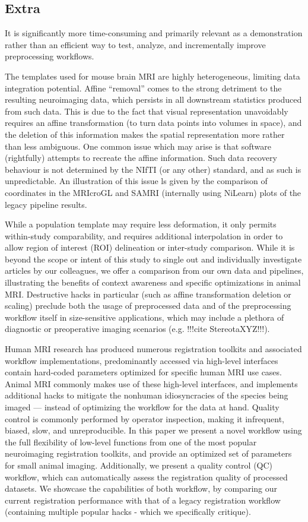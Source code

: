 \subsection{Extra}
It is significantly more time-consuming and primarily relevant as a demonstration rather than an efficient way to test, analyze, and incrementally improve preprocessing workflows.



The templates used for mouse brain MRI are highly heterogeneous, limiting data integration potential.
Affine “removal” comes to the strong detriment to the resulting neuroimaging data, which persists in all downstream statistics produced from such data.
This is due to the fact that visual representation unavoidably requires an affine transformation (to turn data points into volumes in space), and the deletion of this information makes the spatial representation more rather than less ambiguous.
One common issue which may arise is that software (rightfully) attempts to recreate the affine information.
Such data recovery behaviour is not determined by the NIfTI (or any other) standard, and as such is unpredictable.
An illustration of this issue ls given by the comparison of coordinates in the MRIcroGL and SAMRI (internally using NiLearn) plots of the legacy pipeline results.

While a population template may require less deformation, it only permits within-study comparability, and requires additional interpolation in order to allow region of interest (ROI) delineation or inter-study comparison.
While it is beyond the scope or intent of this study to single out and individually investigate articles by our colleagues, we offer a comparison from our own data and pipelines, illustrating the benefits of context awareness and specific optimizations in animal MRI.
Destructive hacks in particular (such as affine transformation deletion or scaling) preclude both the usage of preprocessed data and of the preprocessing workflow itself in size-sensitive applications, which may include a plethora of diagnostic or preoperative imaging scenarios (e.g. !!!cite StereotaXYZ!!!).

Human MRI research has produced numerous registration toolkits and associated workflow implementations, predominantly accessed via high-level interfaces contain hard-coded parameters optimized for specific human MRI use cases.
Animal MRI commonly makes use of these high-level interfaces, and implements additional hacks to mitigate the nonhuman idiosyncracies of the species being imaged --- instead of optimizing the workflow for the data at hand.
Quality control is commonly performed by operator inspection, making it infrequent, biased, slow, and unreproducible.
In this paper we present a novel workflow using the full flexibility of low-level functions from one of the most popular neuroimaging registration toolkits, and provide an optimized set of parameters for small animal imaging.
Additionally, we present a quality control (QC) workflow, which can automatically assess the registration quality of processed datasets.
We showcase the capabilities of both workflow, by comparing our current registration performance with that of a legacy registration workflow (containing multiple popular hacks - which we specifically critique).


